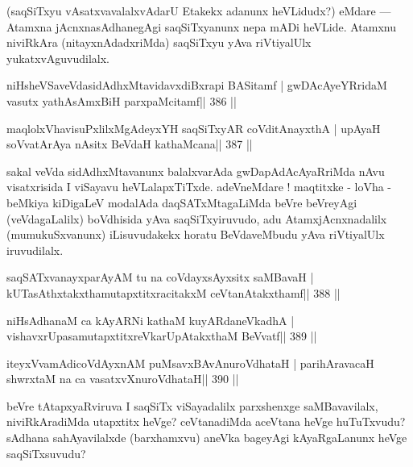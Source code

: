 \begin{artha}
(saqSiTxyu vAsatxvavalalxvAdarU Etakekx adanunx heVLidudx?) eMdare  {\rm ---}  
Atamxna jAcnxnasAdhanegAgi saqSiTxyanunx nepa mADi heVLide. Atamxnu niviRkAra (nitayxnAdadxriMda) saqSiTxyu yAva riVtiyalUlx yukatxvAguvudilalx.
\end{artha}


\begin{shl}
niHsheVSaveVdasidAdhxMtavidavxdiBxrapi BASitamf |
gwDAcAyeYRridaM vasutx yathA\s sAmxBiH parxpaMcitamf\hfill || 386 ||
\end{shl}

\begin{shl}
maqlolxVhavisuPxlilxMgAdeyxYH saqSiTxyAR coVditA\s nayxthA |
upAyaH soV\s vatArAya nAsitx BeVdaH kathaMcana\hfill || 387 ||
\end{shl}

\begin{artha}
sakal veVda sidAdhxMtavanunx balalxvarAda gwDapAdAcAyaRriMda nAvu  visatxrisida I viSayavu heVLalapxTiTxde. adeVneMdare ! maqtitxke -  loVha - beMkiya kiDigaLeV modalAda daqSATxMtagaLiMda beVre beVreyAgi (veVdagaLalilx) boVdhisida yAva saqSiTxyiruvudo, adu AtamxjAcnxnadalilx (mumukuSxvanunx) iLisuvudakekx horatu BeVdaveMbudu yAva riVtiyalUlx iruvudilalx.
\end{artha}

\begin{shl}
saqSATxvanayxparAyAM tu na coVdayxsAyxsitx saMBavaH |
kUTasAthxtakxthamutapxtitxracitakxM ceVtanAtakxthamf\hfill || 388 ||
\end{shl}

\begin{shl}
niHsAdhanaM ca kAyARNi kathaM kuyARdaneVkadhA |
vishavxrUpasamutapxtitxreVkarUpAtakxthaM BeVvatf\hfill || 389 ||
\end{shl}

\begin{shl}
iteyxVvamAdicoVdAyxnAM puMsavxBAvAnuroVdhataH |
parihAravacaH shwrxtaM na ca vasatxvXnuroVdhataH\hfill || 390 ||
\end{shl}

\begin{artha}
beVre tAtapxyaRviruva I saqSiTx viSayadalilx parxshenxge saMBavavilalx, niviRkAra\-diMda utapxtitx heVge? ceVtanadiMda aceVtana heVge huTuTxvudu? sAdhana sahAyavilalxde (barxhamxvu) aneVka bageyAgi kAyaRgaLanunx heVge saqSiTxsuvudu?
\end{artha}

